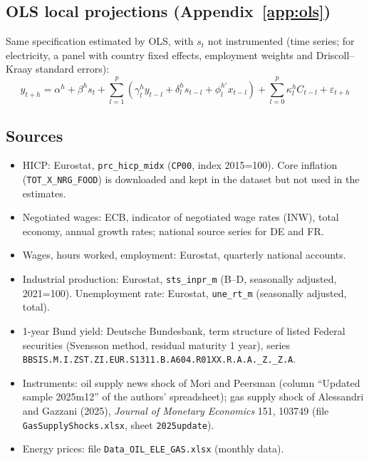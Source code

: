 \documentclass[11pt,a4paper]{article}
\begin{document}
\subsection{OLS local projections (Appendix~\ref{app:ols})}

\noindent Same specification estimated by OLS, with $s_t$ not instrumented (time series;
for electricity, a panel with country fixed effects, employment weights and
Driscoll--Kraay standard errors):
\begin{equation}
y_{t+h} = \alpha^h + \beta^h s_{t}
 + \sum_{l=1}^{p} \left( \gamma_l^h y_{t-l} + \delta_l^h s_{t-l} + \phi_l^{h\prime} x_{t-l} \right)
 + \sum_{l=0}^{p} \kappa_l^h C_{t-l} + \varepsilon_{t+h}
\end{equation}

\subsection{Sources}

\begin{itemize}
\item HICP: Eurostat, \texttt{prc\_hicp\_midx} (\texttt{CP00}, index 2015=100). Core inflation
 (\texttt{TOT\_X\_NRG\_FOOD}) is downloaded and kept in the dataset but not used in the estimates.
\item Negotiated wages: ECB, indicator of negotiated wage rates (INW), total economy,
 annual growth rates; national source series for DE and FR.
\item Wages, hours worked, employment: Eurostat, quarterly national accounts.
\item Industrial production: Eurostat, \texttt{sts\_inpr\_m} (B--D, seasonally adjusted, 2021=100).
 Unemployment rate: Eurostat, \texttt{une\_rt\_m} (seasonally adjusted, total).
\item 1-year Bund yield: Deutsche Bundesbank, term structure of listed Federal securities
 (Svensson method, residual maturity 1 year), series
 \texttt{BBSIS.M.I.ZST.ZI.EUR.S1311.B.A604.R01XX.R.A.A.\_Z.\_Z.A}.
\item Instruments: oil supply news shock of Mori and Peersman (column ``Updated sample
 2025m12'' of the authors' spreadsheet); gas supply shock of Alessandri and Gazzani
 (2025), \emph{Journal of Monetary Economics} 151, 103749 (file \texttt{GasSupplyShocks.xlsx},
 sheet \texttt{2025update}).
\item Energy prices: file \texttt{Data\_OIL\_ELE\_GAS.xlsx} (monthly data).
\end{itemize}
\end{document}
